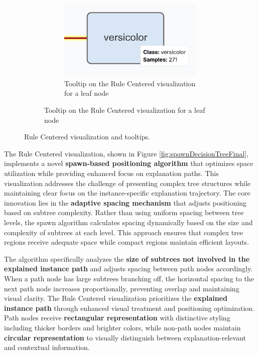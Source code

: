 \begin{figure}[ht!]
\begin{subfigure}[c]{0.28\textwidth}
        \begin{subfigure}[c]{\linewidth}
            \centering
            \includegraphics[width=\linewidth]{images/spawnDecisionTreeFinalTooltipLeaf.png}
            \caption{Tooltip on the Rule Centered visualization for a leaf node}
            \label{fig:spawnDecisionTreeFinalTooltipLeaf}
        \end{subfigure}
    \end{subfigure}
    
    \caption{Rule Centered visualization and tooltips.}
\end{figure}

The Rule Centered visualization, shown in Figure \ref{fig:spawnDecisionTreeFinal}, implements a novel \textbf{spawn-based positioning algorithm} that optimizes space utilization while providing enhanced focus on explanation paths. This visualization addresses the challenge of presenting complex tree structures while maintaining clear focus on the instance-specific explanation trajectory.
% 
The core innovation lies in the \textbf{adaptive spacing mechanism} that adjusts positioning based on subtree complexity. Rather than using uniform spacing between tree levels, the spawn algorithm calculates spacing dynamically based on the size and complexity of subtrees at each level. This approach ensures that complex tree regions receive adequate space while compact regions maintain efficient layouts.

The algorithm specifically analyzes the \textbf{size of subtrees not involved in the explained instance path} and adjusts spacing between path nodes accordingly. When a path node has large subtrees branching off, the horizontal spacing to the next path node increases proportionally, preventing overlap and maintaining visual clarity.
% 
The Rule Centered visualization prioritizes the \textbf{explained instance path} through enhanced visual treatment and positioning optimization. Path nodes receive \textbf{rectangular representation} with distinctive styling including thicker borders and brighter colors, while non-path nodes maintain \textbf{circular representation} to visually distinguish between explanation-relevant and contextual information.

